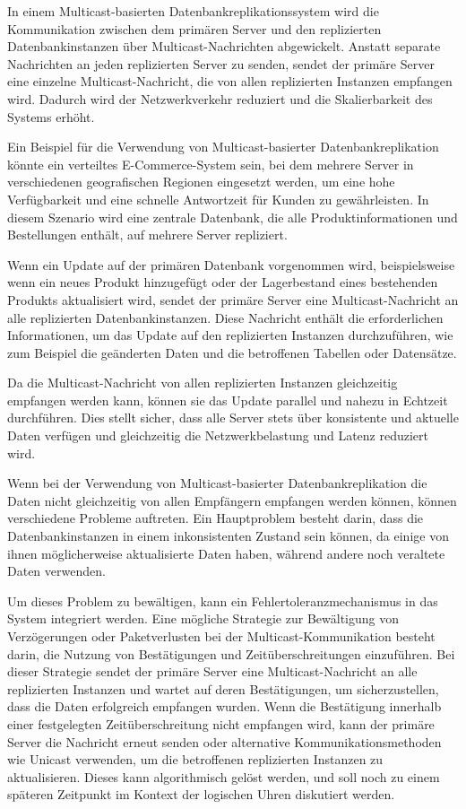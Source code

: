 \documentclass[../vs-script-first-v01.tex]{subfiles}
\begin{document}
In einem Multicast-basierten Datenbankreplikationssystem wird die Kommunikation zwischen dem primären Server und den replizierten Datenbankinstanzen über Multicast-Nachrichten abgewickelt. Anstatt separate Nachrichten an jeden replizierten Server zu senden, sendet der primäre Server eine einzelne Multicast-Nachricht, die von allen replizierten Instanzen empfangen wird. Dadurch wird der Netzwerkverkehr reduziert und die Skalierbarkeit des Systems erhöht.

Ein Beispiel für die Verwendung von Multicast-basierter Datenbankreplikation könnte ein verteiltes E-Commerce-System sein, bei dem mehrere Server in verschiedenen geografischen Regionen eingesetzt werden, um eine hohe Verfügbarkeit und eine schnelle Antwortzeit für Kunden zu gewährleisten. In diesem Szenario wird eine zentrale Datenbank, die alle Produktinformationen und Bestellungen enthält, auf mehrere Server repliziert.

Wenn ein Update auf der primären Datenbank vorgenommen wird, beispielsweise wenn ein neues Produkt hinzugefügt oder der Lagerbestand eines bestehenden Produkts aktualisiert wird, sendet der primäre Server eine Multicast-Nachricht an alle replizierten Datenbankinstanzen. Diese Nachricht enthält die erforderlichen Informationen, um das Update auf den replizierten Instanzen durchzuführen, wie zum Beispiel die geänderten Daten und die betroffenen Tabellen oder Datensätze.

Da die Multicast-Nachricht von allen replizierten Instanzen gleichzeitig empfangen werden kann, können sie das Update parallel und nahezu in Echtzeit durchführen. Dies stellt sicher, dass alle Server stets über konsistente und aktuelle Daten verfügen und gleichzeitig die Netzwerkbelastung und Latenz reduziert wird.

Wenn bei der Verwendung von Multicast-basierter Datenbankreplikation die Daten nicht gleichzeitig von allen Empfängern empfangen werden können, können verschiedene Probleme auftreten. Ein Hauptproblem besteht darin, dass die Datenbankinstanzen in einem inkonsistenten Zustand sein können, da einige von ihnen möglicherweise aktualisierte Daten haben, während andere noch veraltete Daten verwenden.

Um dieses Problem zu bewältigen, kann ein Fehlertoleranzmechanismus in das System integriert werden. Eine mögliche Strategie zur Bewältigung von Verzögerungen oder Paketverlusten bei der Multicast-Kommunikation besteht darin, die Nutzung von Bestätigungen und Zeitüberschreitungen einzuführen. Bei dieser Strategie sendet der primäre Server eine Multicast-Nachricht an alle replizierten Instanzen und wartet auf deren Bestätigungen, um sicherzustellen, dass die Daten erfolgreich empfangen wurden. Wenn die Bestätigung innerhalb einer festgelegten Zeitüberschreitung nicht empfangen wird, kann der primäre Server die Nachricht erneut senden oder alternative Kommunikationsmethoden wie Unicast verwenden, um die betroffenen replizierten Instanzen zu aktualisieren. Dieses kann algorithmisch gelöst werden, und soll noch zu einem späteren Zeitpunkt im Kontext der logischen Uhren diskutiert werden. 
\end{document}
